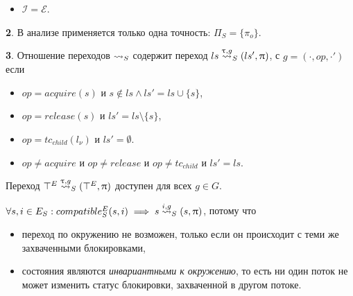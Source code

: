 \begin{itemize}
\begin{proof}
Это означает $\epp_S \begin{pmatrix}
\begin{pmatrix}
ls \\
t_1 
\end{pmatrix}& ,
\dots& ,
\begin{pmatrix}
ls_m \\
t_m 
\end{pmatrix}
\end{pmatrix} \subseteq \epp_S \begin{pmatrix}
\begin{pmatrix}
ls' \\
t_1 
\end{pmatrix}& ,
\dots& ,
\begin{pmatrix}
ls_m \\
t_m 
\end{pmatrix}
\end{pmatrix}$
\end{proof}

\item $\mathcal{I}=\mathcal{E}$.
\end{itemize}

{\textbf 2.} В анализе применяется только одна точность: $\Pi_S = \{\pi_o\}$.

{\textbf 3.} Отношение переходов $\leadsto_S$ содержит переход $ls \stackrel{\uptau, g}{\leadsto}_S (ls', \uppi)$, с $g=(\cdot,op,\cdot')$ если 
\begin{itemize}
\item $op=acquire(s)$ и $s \notin ls \land ls' = ls \cup \{s\}$,
\item $op=release(s)$ и $ls' = ls \setminus \{s\}$,
\item $op=tc_{child}(l_\nu)$ и $ls' = \emptyset$. 
\item $op \neq acquire$ и $op \neq release$ и $op \neq tc_{child}$ и $ls' = ls$.
\end{itemize}

Переход $\top^E \stackrel{\uptau, g}{\leadsto}_S (\top^E, \uppi)$ доступен для всех $g\in G$.

$\forall s,i \in E_S: compatible^E_S({s,i}) \implies s \stackrel{i, g}{\leadsto}_S (s, \uppi)$, потому что 
\begin{itemize}
\item переход по окружению не возможен, только если он происходит с теми же захваченными блокировками,
\item состояния являются {\em инвариантными к окружению}, то есть ни один поток не может изменить статус блокировки, захваченной в другом потоке.
\end{itemize}

